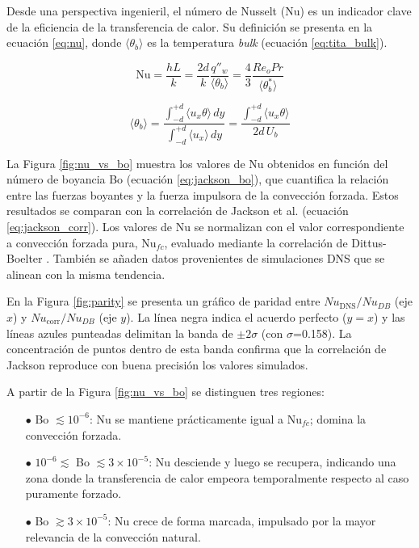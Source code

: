 Desde una perspectiva ingenieril, el número de Nusselt (Nu) es un indicador clave de la eficiencia de la transferencia de calor. Su definición se presenta en la ecuación \ref{eq:nu}, donde $\langle \theta_b \rangle$ es la temperatura \textit{bulk} (ecuación \ref{eq:tita_bulk}).

\begin{equation}
\text{Nu} = \frac{h L}{k} = \frac{2d}{k} \frac{q''_w}{\langle \theta_b \rangle} = \frac{4}{3} \frac{Re_o Pr}{\langle \theta^*_b \rangle}	
\label{eq:nu}
\end{equation}

\begin{equation}
\langle \theta_b \rangle = \frac{\int_{-d}^{+d} \langle u_x \theta \rangle \, dy}{\int_{-d}^{+d} \langle u_x \rangle \, dy} = \frac{\int_{-d}^{+d} \langle u_x \theta \rangle }{2d \, U_b}
\label{eq:tita_bulk}
\end{equation}

La Figura \ref{fig:nu_vs_bo} muestra los valores de Nu obtenidos en función del número de boyancia Bo (ecuación \ref{eq:jackson_bo}), que cuantifica la relación entre las fuerzas boyantes y la fuerza impulsora de la convección forzada. Estos resultados se comparan con la correlación de Jackson et al. \cite{jackson1989studies} (ecuación \ref{eq:jackson_corr}). Los valores de Nu se normalizan con el valor correspondiente a convección forzada pura, Nu$_{fc}$, evaluado mediante la correlación de Dittus-Boelter \cite{incropera}. También se añaden datos provenientes de simulaciones DNS \cite{you2003direct} que se alinean con la misma tendencia.

En la Figura \ref{fig:parity} se presenta un gráfico de paridad entre $Nu_{\text{DNS}}/Nu_{DB}$ (eje $x$) y $Nu_{\text{corr}}/Nu_{DB}$ (eje $y$). La línea negra indica el acuerdo perfecto ($y=x$) y las líneas azules punteadas delimitan la banda de $\pm2\sigma$ (con $\sigma$=0.158). La concentración de puntos dentro de esta banda confirma que la correlación de Jackson reproduce con buena precisión los valores simulados.

A partir de la Figura \ref{fig:nu_vs_bo} se distinguen tres regiones:

\begin{itemize}
  \item[$\bullet$] Bo $\lesssim 10^{-6}$: Nu se mantiene prácticamente igual a Nu$_{fc}$; domina la convección forzada.
  \item[$\bullet$] $10^{-6} \lesssim$ Bo $\lesssim 3 \times 10^{-5}$: Nu desciende y luego se recupera, indicando una zona donde la transferencia de calor empeora temporalmente respecto al caso puramente forzado.
  \item[$\bullet$] Bo $\gtrsim 3 \times 10^{-5}$: Nu crece de forma marcada, impulsado por la mayor relevancia de la convección natural.
\end{itemize}

